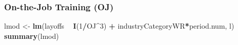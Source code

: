 \documentclass[
]{article}
\newenvironment{Shaded}{\begin{snugshade}}{\end{snugshade}}
\newcommand{\DecValTok}[1]{\textcolor[rgb]{0.00,0.00,0.81}{#1}}
\newcommand{\KeywordTok}[1]{\textcolor[rgb]{0.13,0.29,0.53}{\textbf{#1}}}
\newcommand{\NormalTok}[1]{#1}
\newcommand{\OperatorTok}[1]{\textcolor[rgb]{0.81,0.36,0.00}{\textbf{#1}}}
\newcommand{\StringTok}[1]{\textcolor[rgb]{0.31,0.60,0.02}{#1}}
\begin{document}
\hypertarget{on-the-job-training-oj-3}{%
\subsubsection{On-the-Job Training
(OJ)}\label{on-the-job-training-oj-3}}

\begin{Shaded}
\begin{Highlighting}[]
\NormalTok{lmod <-}\StringTok{ }\KeywordTok{lm}\NormalTok{(layoffs }\OperatorTok{~}\StringTok{ }\KeywordTok{I}\NormalTok{(}\DecValTok{1}\OperatorTok{/}\NormalTok{OJ}\OperatorTok{^}\DecValTok{3}\NormalTok{) }\OperatorTok{+}\StringTok{ }\NormalTok{industryCategoryWR}\OperatorTok{*}\NormalTok{period.num, l)}
\KeywordTok{summary}\NormalTok{(lmod)}
\end{Highlighting}
\end{Shaded}
\end{document}
